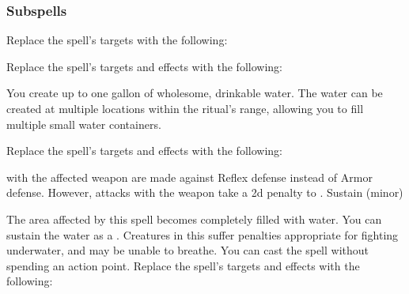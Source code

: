 \subsubsection{Subspells}
Replace the spell's targets with the following:
\begin{spellcontent}
\begin{augmenttargetinginfo}
\end{augmenttargetinginfo}
\end{spellcontent}
Replace the spell's targets and effects with the following:
\begin{spellcontent}
\begin{augmenttargetinginfo}
\spellrng{\rngclose}
\end{augmenttargetinginfo}
\begin{augmenteffects}
\spelleffect
You create up to one gallon of wholesome, drinkable water.
The water can be created at multiple locations within the ritual's range, allowing you to fill multiple small water containers.
\end{augmenteffects}
\end{spellcontent}
Replace the spell's targets and effects with the following:
\begin{spellcontent}
\begin{augmenttargetinginfo}
\end{augmenttargetinginfo}
\begin{augmenteffects}
\spelleffect
{} with the affected weapon are made against Reflex defense instead of Armor defense.
However, attacks with the weapon take a \minus2d penalty to .
\spelldur Sustain (minor)
\end{augmenteffects}
\end{spellcontent}
The area affected by this spell becomes completely filled with water.
You can sustain the water as a .
Creatures in this  suffer penalties appropriate for fighting underwater, and may be unable to breathe.
You can cast the spell without spending an action point.
Replace the spell's targets and effects with the following:
